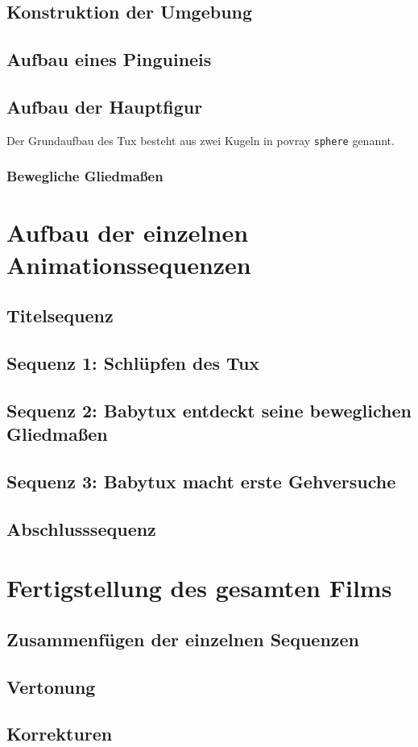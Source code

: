\documentclass[11pt,parskip]{scrartcl}
\begin{document}
\subsection{Konstruktion der Umgebung}


\subsection{Aufbau eines Pinguineis}


\subsection{Aufbau der Hauptfigur}
Der Grundaufbau des Tux besteht aus zwei Kugeln in povray \texttt{sphere}
genannt.


\subsubsection{Bewegliche Gliedmaßen}


\newpage

\section{Aufbau der einzelnen Animationssequenzen}


\subsection{Titelsequenz}


\subsection{Sequenz 1: Schlüpfen des Tux}


\subsection{Sequenz 2: Babytux entdeckt seine beweglichen Gliedmaßen}


\subsection{Sequenz 3: Babytux macht erste Gehversuche}


\subsection{Abschlusssequenz}


\newpage

\section{Fertigstellung des gesamten Films}


\subsection{Zusammenfügen der einzelnen Sequenzen}


\subsection{Vertonung}


\subsection{Korrekturen}


\newpage
{}


\end{document}
